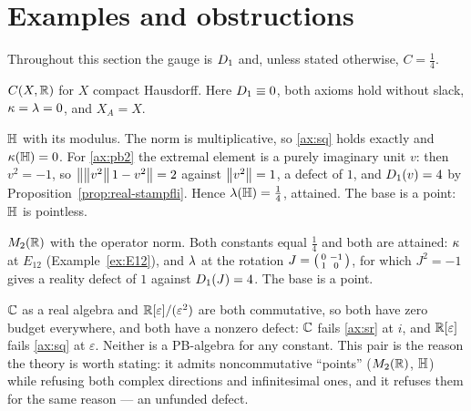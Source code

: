 \section{Examples and obstructions}
\label{sec:examples}

Throughout this section the gauge is $D_1$ and, unless stated otherwise,
$C=\tfrac14$.

\begin{example}
$C(X,\mathbb{R})$ for $X$ compact Hausdorff.  Here $D_1\equiv0$, both axioms hold
without slack, $\kappa=\lambda=0$, and $X_A=X$.
\end{example}

\begin{example}\label{ex:H}
$\mathbb{H}$ with its modulus.  The norm is multiplicative, so \eqref{ax:sq} holds
exactly and $\kappa(\mathbb{H})=0$.  For \eqref{ax:pb2} the extremal element is a purely
imaginary unit $v$: then $v^2=-1$, so
$\bigl\lVert\left\lVert v^2\right\rVert1-v^2\bigr\rVert=2$ against $\left\lVert v^2\right\rVert=1$, a defect of
$1$, and $D_1(v)=4$ by Proposition~\ref{prop:real-stampfli}.  Hence
$\lambda(\mathbb{H})=\tfrac14$, attained.  The base is a point: $\mathbb{H}$ is pointless.
\end{example}

\begin{example}\label{ex:M2}
$M_2(\mathbb{R})$ with the operator norm.  Both constants equal $\tfrac14$ and both are
attained: $\kappa$ at $E_{12}$ (Example~\ref{ex:E12}), and $\lambda$ at the rotation
$J=\begin{psmallmatrix}0&-1\\1&0\end{psmallmatrix}$, for which $J^2=-1$ gives a
reality defect of $1$ against $D_1(J)=4$.  The base is a point.
\end{example}

\begin{example}\label{ex:excluded}
$\mathbb{C}$ as a real algebra and $\mathbb{R}[\varepsilon]/(\varepsilon^2)$ are both
commutative, so both have zero budget everywhere, and both have a nonzero
defect: $\mathbb{C}$ fails \eqref{ax:sr} at $i$, and $\mathbb{R}[\varepsilon]$ fails
\eqref{ax:sq} at $\varepsilon$.  Neither is a PB-algebra for any constant.  This
pair is the reason the theory is worth stating: it admits noncommutative
``points'' ($M_2(\mathbb{R})$, $\mathbb{H}$) while refusing both complex directions and
infinitesimal ones, and it refuses them for the same reason --- an unfunded
defect.
\end{example}

